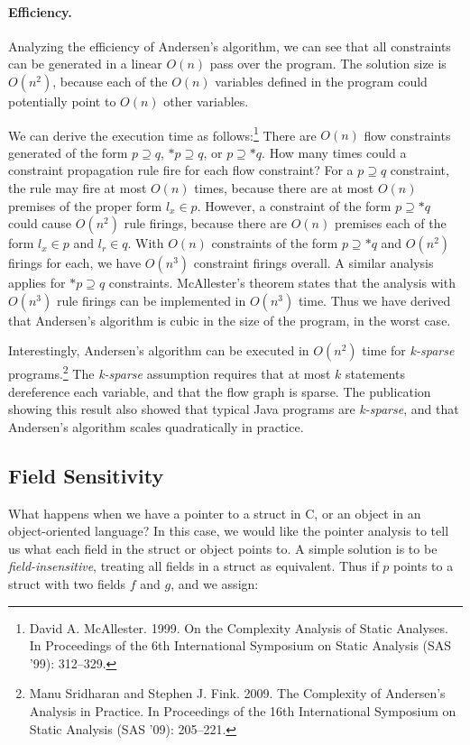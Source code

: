 \documentclass[11pt]{article}
\begin{document}
\paragraph{Efficiency.} Analyzing the efficiency of Andersen's algorithm, we can see that all
constraints can be generated in a linear $O(n)$ pass over the program. The
solution size is $O(n^2)$, because each of the $O(n)$ variables defined in the
program could potentially point to $O(n)$ other variables.

We can derive the execution time as follows:\footnote{David A. McAllester. 1999.
  On the Complexity Analysis of Static Analyses. In Proceedings of the 6th
  International Symposium on Static Analysis (SAS ’99): 312–329.} There are
$O(n)$ flow constraints generated of the form $p \supseteq q$, $*p \supseteq q$,
or $p \supseteq *q$. How many times could a constraint propagation rule fire for
each flow constraint? For a $p \supseteq q$ constraint, the rule may fire at
most $O(n)$ times, because there are at most $O(n)$ premises of the proper form
$l_x \in p$. However, a constraint of the form $p \supseteq *q$ could cause
$O(n^2)$ rule firings, because there are $O(n)$ premises each of the form
$l_x \in p$ and $l_r \in q$. With $O(n)$ constraints of the form
$p \supseteq *q$ and $O(n^2)$ firings for each, we have $O(n^3)$ constraint
firings overall. A similar analysis applies for $*p \supseteq q$ constraints.
McAllester's theorem states that the analysis with $O(n^3)$ rule firings can be
implemented in $O(n^3)$ time. Thus we have derived that Andersen's algorithm is
cubic in the size of the program, in the worst case.

Interestingly, Andersen's algorithm can be executed in $O(n^2)$ time for
\textit{k-sparse} programs.\footnote{Manu Sridharan and Stephen J. Fink. 2009.
  The Complexity of Andersen’s Analysis in Practice. In Proceedings of the 16th
  International Symposium on Static Analysis (SAS ’09): 205–221.} The
\textit{k-sparse} assumption requires that at most $k$ statements dereference
each variable, and that the flow graph is sparse. The publication showing this
result also showed that typical Java programs are \textit{k-sparse}, and that
Andersen's algorithm scales quadratically in practice.

\subsection{Field Sensitivity}

What happens when we have a pointer to a struct in C, or an object in an
object-oriented language? In this case, we would like the pointer analysis to
tell us what each field in the struct or object points to. A simple solution is
to be \textit{field-insensitive}, treating all fields in a struct as equivalent.
Thus if $p$ points to a struct with two fields $f$ and $g$, and we assign:
\end{document}
